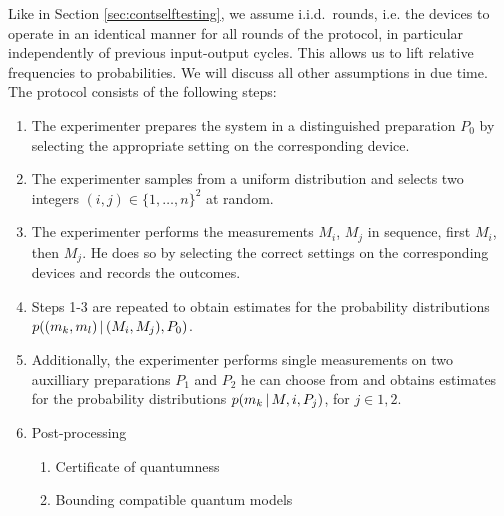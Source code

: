 Like in Section \ref{sec:contselftesting}, we assume i.i.d.\ rounds, i.e. the devices to operate in an identical manner for all rounds of the protocol, in particular independently of previous input-output cycles. This allows us to lift relative frequencies to probabilities. We will discuss all other assumptions in due time. The protocol consists of the following steps:
\begin{enumerate}
\item The experimenter prepares the system in a distinguished preparation $P_0$ by selecting the appropriate setting on the corresponding device.
\item The experimenter samples from a uniform distribution and selects two integers $(i,j)\in\{1,\dots,n\}^2$ at random.
\item The experimenter performs the measurements $M_i$, $M_j$ in sequence, first $M_i$, then $M_j$. He does so by selecting the correct settings on the corresponding devices and records the outcomes.
\item Steps 1-3 are repeated to obtain estimates for the probability distributions \\ $p((m_k,m_l)\thinspace\vert\thinspace (M_i,M_j),P_0)$. 
\item Additionally, the experimenter performs single measurements on two auxilliary preparations $P_1$ and $P_2$ he can choose from and obtains estimates for the probability distributions $p(m_k\thinspace\vert\thinspace M,i, P_j)$, for $j\in{1,2}$.
\item Post-processing
	\begin{enumerate}
	\item Certificate of quantumness
	\item Bounding compatible quantum models
	\end{enumerate}
\end{enumerate}

